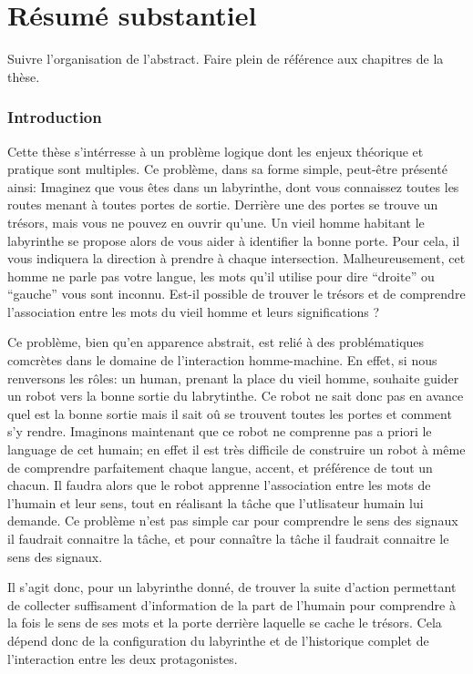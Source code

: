 
\chapter*{Résumé substantiel}
\label{chapter:frecnhresume}
\minitoc

Suivre l'organisation de l'abstract. Faire plein de référence aux chapitres de la thèse.

\subsection*{Introduction}

Cette thèse s'intérresse à un problème logique dont les enjeux théorique et pratique sont multiples. Ce problème, dans sa forme simple, peut-être présenté ainsi: Imaginez que vous êtes dans un labyrinthe, dont vous connaissez toutes les routes menant à toutes  portes de sortie. Derrière une des portes se trouve un trésors, mais vous ne pouvez en ouvrir qu'une. Un vieil homme habitant le labyrinthe se propose alors de vous aider à identifier la bonne porte. Pour cela, il vous indiquera la direction à prendre à chaque intersection. Malheureusement, cet homme ne parle pas votre langue, les mots qu'il utilise pour dire ``droite'' ou ``gauche'' vous sont inconnu. Est-il possible de trouver le trésors et de comprendre l'association entre les mots du vieil homme et leurs significations ?

Ce problème, bien qu'en apparence abstrait, est relié à des problématiques comcrètes dans le domaine de l'interaction homme-machine. En effet, si nous renversons les rôles: un human, prenant la place du vieil homme, souhaite guider un robot vers la bonne sortie du labrytinthe. Ce robot ne sait donc pas en avance quel est la bonne sortie mais il sait oû se trouvent toutes les portes et comment s'y rendre. Imaginons maintenant que ce robot ne comprenne pas a priori le language de cet humain; en effet il est très difficile de construire un robot à même de comprendre parfaitement chaque langue, accent, et préférence de tout un chacun. Il faudra alors que le robot apprenne l'association entre les mots de l'humain et leur sens, tout en réalisant la tâche que l'utlisateur humain lui demande. Ce problème n'est pas simple car pour comprendre le sens des signaux il faudrait connaitre la tâche, et pour connaître la tâche il faudrait connaitre le sens des signaux.

Il s'agit donc, pour un labyrinthe donné, de trouver la suite d'action permettant de collecter suffisament d'information de la part de l'humain pour comprendre à la fois le sens de ses mots et la porte derrière laquelle se cache le trésors. Cela dépend donc de la configuration du labyrinthe et de l'historique complet de l'interaction entre les deux protagonistes.

